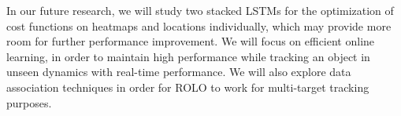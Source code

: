 \documentclass{article}
\begin{document}
In  our future research, we will study two stacked LSTMs for the optimization of cost functions on heatmaps and locations individually, which may provide more room for further performance improvement. %
We will focus on efficient online learning, in order to maintain high performance while tracking an object in unseen dynamics with real-time performance. We will also explore data association techniques in order for ROLO to work for multi-target tracking purposes.


\small

\end{document}
